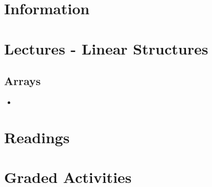 \documentclass{article}
\begin{document}
\section{Information}




\section{Lectures - Linear Structures}


\subsection{Arrays}

\begin{itemize}
	\item 
\end{itemize}

























































\section{Readings}




\section{Graded Activities}
\end{document}
